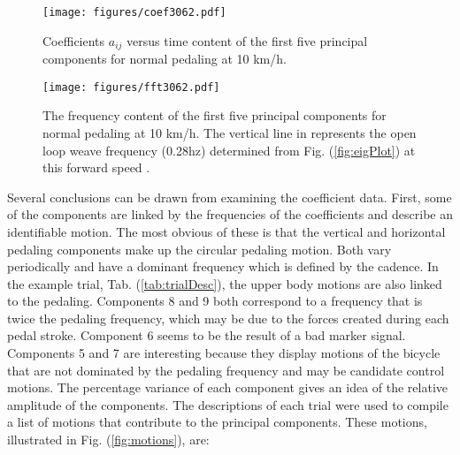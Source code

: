 \documentclass[smallextended]{svjour3}     %
\begin{document}
\begin{figure}[tb]
    \begin{center}
        \texttt{[image: figures/coef3062.pdf]}
    \end{center}
    \caption{Coefficients $a_{ij}$ versus time content of the first five
    principal components for normal pedaling at 10 km/h.}
    \label{fig:coef3062}
\end{figure}
\begin{figure}[tb]
    \begin{center}
        \texttt{[image: figures/fft3062.pdf]}
    \end{center}
    \caption{The frequency
    content of the first five principal components for normal pedaling at 10
    km/h. The vertical line in represents the open loop weave frequency
    (0.28hz) determined from Fig. (\ref{fig:eigPlot}) at this forward speed .}
    \label{fig:fft3062}
\end{figure}
Several conclusions can be drawn from examining the coefficient data. First,
some of the components are linked by the frequencies of the coefficients
and describe an identifiable motion. The most obvious of these is that the vertical
and horizontal pedaling components make up the circular pedaling motion.
Both vary periodically and have a dominant frequency which is defined by the
cadence. In the example trial, Tab. (\ref{tab:trialDesc}), the upper body
motions are also linked to the pedaling. Components 8 and 9 both correspond to
a frequency that is twice the pedaling frequency, which may be due to the
forces created during each pedal stroke. Component 6 seems to be the result of a
bad marker signal. Components 5 and 7 are interesting because they display
motions of the bicycle that are not dominated by the pedaling frequency and may
be candidate control motions. The percentage variance of each component gives
an idea of the relative amplitude of the components. The descriptions of each
trial were used to compile a list of motions that contribute to the principal
components. These motions, illustrated in Fig. (\ref{fig:motions}), are:
\end{document}
